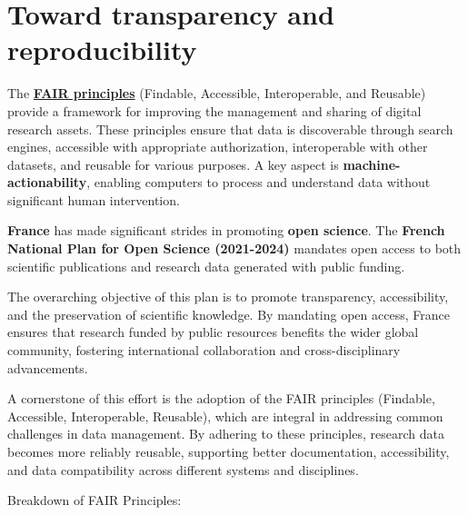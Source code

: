\documentclass[
]{book}
\begin{document}
\section{Toward transparency and reproducibility}\label{toward-transparency-and-reproducibility}

The \href{https://www.ouvrirlascience.fr/fair-principles/}{\textbf{FAIR principles}} (Findable, Accessible, Interoperable, and Reusable) provide a framework for improving the management and sharing of digital research assets.
These principles ensure that data is discoverable through search engines, accessible with appropriate authorization, interoperable with other datasets, and reusable for various purposes.
A key aspect is \textbf{machine-actionability}, enabling computers to process and understand data without significant human intervention.

\textbf{France} has made significant strides in promoting \textbf{open science}.
The \textbf{French National Plan for Open Science (2021-2024)} mandates open access to both scientific publications and research data generated with public funding.

The overarching objective of this plan is to promote transparency, accessibility, and the preservation of scientific knowledge.
By mandating open access, France ensures that research funded by public resources benefits the wider global community, fostering international collaboration and cross-disciplinary advancements.

A cornerstone of this effort is the adoption of the FAIR principles (Findable, Accessible, Interoperable, Reusable), which are integral in addressing common challenges in data management.
By adhering to these principles, research data becomes more reliably reusable, supporting better documentation, accessibility, and data compatibility across different systems and disciplines.

Breakdown of FAIR Principles:
\end{document}
